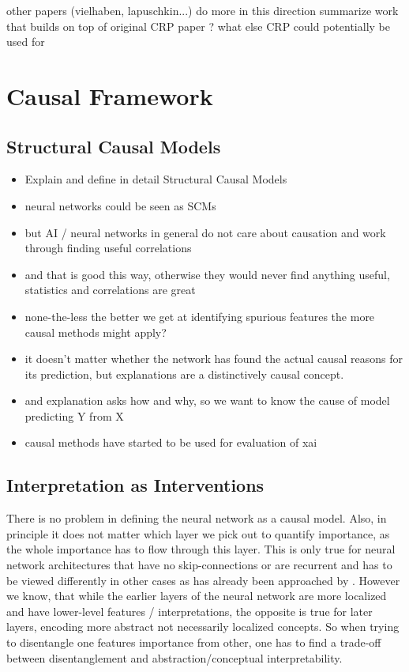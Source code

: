 
other papers (vielhaben, lapuschkin...) do more in this direction
summarize work that builds on top of original CRP paper ?
what else CRP could potentially be used for
\cite{Dreyer2023,Pahde2023,Dreyer2023a,Vielhaben2022,Vielhaben2023,Achtibat2023}

\section{Causal Framework}
\subsection{Structural Causal Models}

\begin{itemize}
    \item Explain and define in detail Structural Causal Models
    \item neural networks could be seen as SCMs \cite{Chattopadhyay2019}
    \item but AI / neural networks in general do not care about causation and work through finding useful correlations
    \item and that is good this way, otherwise they would never find anything useful, statistics and correlations are great
    \item none-the-less the better we get at identifying spurious features the more causal methods might apply?
    \item it doesn't matter whether the network has found the actual causal reasons for its prediction, but explanations are a distinctively causal concept.
    \item and explanation asks how and why, so we want to know the cause of model predicting Y from X
    \item causal methods have started to be used for evaluation of xai
\end{itemize}

\subsection{Interpretation as Interventions}
There is no problem in defining the neural network as a causal model. 
Also, in principle it does not matter which layer we pick out to quantify importance, as the whole importance has to flow through this layer. This is only true for neural network architectures that have no skip-connections or are recurrent and has to be viewed differently in other cases as has already been approached by \cite{Chattopadhyay2019}. However we know, that while the earlier layers of the neural network are more localized and have lower-level features / interpretations, the opposite is true for later layers, encoding more abstract not necessarily localized concepts. 
So when trying to disentangle one features importance from other, one has to find a trade-off between disentanglement and abstraction/conceptual interpretability.
 


